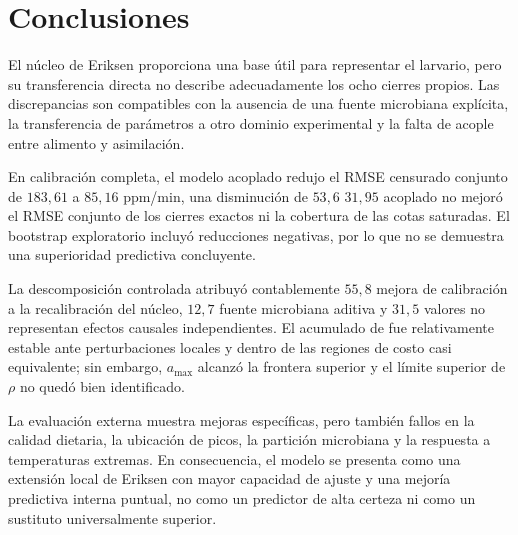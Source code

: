 \section{Conclusiones}

El núcleo de Eriksen proporciona una base útil para representar el
\co{} larvario, pero su transferencia directa no describe adecuadamente
los ocho cierres propios. Las discrepancias son compatibles con la
ausencia de una fuente microbiana explícita, la transferencia de
parámetros a otro dominio experimental y la falta de acople entre
alimento y asimilación.

En calibración completa, el modelo acoplado redujo el RMSE censurado
conjunto de $183{,}61$ a $85{,}16$ ppm/min, una disminución de
$53{,}6$ %
$31{,}95$ %
acoplado no mejoró el RMSE conjunto de los cierres exactos ni la
cobertura de las cotas saturadas. El bootstrap exploratorio incluyó
reducciones negativas, por lo que no se demuestra una superioridad
predictiva concluyente.

La descomposición controlada atribuyó contablemente $55{,}8$ %
mejora de calibración a la recalibración del núcleo, $12{,}7$ %
fuente microbiana aditiva y $31{,}5$ %
valores no representan efectos causales independientes. El acumulado de
\co{} fue relativamente estable ante perturbaciones locales y dentro de
las regiones de costo casi equivalente; sin embargo, $a_{\max}$ alcanzó
la frontera superior y el límite superior de $\rho$ no quedó bien
identificado.

La evaluación externa muestra mejoras específicas, pero también fallos
en la calidad dietaria, la ubicación de picos, la partición microbiana y
la respuesta a temperaturas extremas. En consecuencia, el modelo se
presenta como una extensión local de Eriksen con mayor capacidad de
ajuste y una mejoría predictiva interna puntual, no como un predictor
de alta certeza ni como un sustituto universalmente superior.
